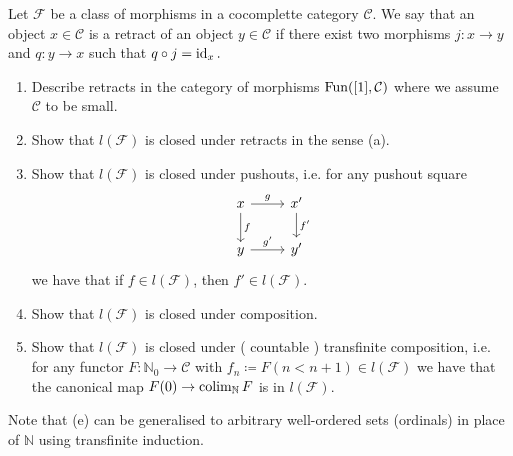 \begin{Exercise}
    Let $ \mathcal{ F } $ be a class of morphisms in a cocomplette category $ \mathcal{ C } $.
    We say that an object $ x \in \mathcal{ C } $ is a retract of an object $ y \in \mathcal{ C } $ if there exist two morphisms $ j : x \to y $ and $ q: y \to x $ such that $ q \circ j = \operatorname{id}_x .$
    
    \begin{enumerate}[label=(\alph*)]
        \item 
        Describe retracts in the category of morphisms $ \operatorname{Fun} ( [ 1 ] , \mathcal{ C } ) $ where we assume $ \mathcal{ C } $ to be small.
    
        \item 
        Show that $ l ( \mathcal{ F } ) $ is closed under retracts in the sense (a).
    
        \item 
        Show that $ l ( \mathcal{ F } ) $ is closed under pushouts, i.e. for any pushout square
        \[
        \begin{tikzcd}
            x 
            \ar[r, "g"]
            \ar[d, "f"]
            &
            x'
            \ar[d,"f'"]
            \\
            y
            \ar[r, "g'"]
            &
            y'
        \end{tikzcd}
        \]
        we have that if $ f \in l ( \mathcal{ F } ) $, then $ f' \in l ( \mathcal{ F } ) $.
    
        \item 
        Show that $ l ( \mathcal{ F } )$ is closed under composition.
    
        \item 
        Show that $ l ( \mathcal{ F } ) $ is closed under ( countable ) transfinite composition, i.e. for any functor $ F : \mathbb{ N }_0 \to \mathcal{ C } $ with $ f_n \coloneqq F ( n < n + 1 ) \in l ( \mathcal{ F } ) $ we have that the canonical map $ F ( 0 ) \to \operatorname{colim}_{ \mathbb{ N } } F $ is in $ l ( \mathcal{ F } ) $.
    \end{enumerate}
    
    Note that (e) can be generalised to arbitrary well-ordered sets (ordinals) in place of $ \mathbb{ N } $ using transfinite induction.
\end{Exercise}

